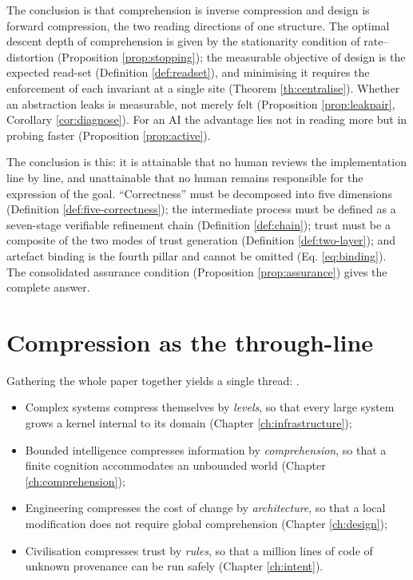 \begin{problem}
The conclusion is that comprehension is inverse compression and design is forward
compression, the two reading directions of one structure. The optimal descent depth of
comprehension is given by the stationarity condition of rate--distortion
(Proposition \ref{prop:stopping}); the measurable objective of design is the expected
read-set (Definition \ref{def:readset}), and minimising it requires the enforcement of
each invariant at a single site (Theorem \ref{th:centralise}). Whether an abstraction
leaks is measurable, not merely felt (Proposition \ref{prop:leakpair},
Corollary \ref{cor:diagnose}). For an AI the advantage lies not in reading more but in
probing faster (Proposition \ref{prop:active}).
\end{problem}

\begin{problem}
The conclusion is this: it is attainable that no human reviews the implementation line
by line, and unattainable that no human remains responsible for the expression of the
goal. ``Correctness'' must be decomposed into five dimensions
(Definition \ref{def:five-correctness}); the intermediate process must be defined as a
seven-stage verifiable refinement chain (Definition \ref{def:chain}); trust must be a
composite of the two modes of trust generation (Definition \ref{def:two-layer}); and
artefact binding is the fourth pillar and cannot be omitted (Eq. \eqref{eq:binding}). The
consolidated assurance condition (Proposition \ref{prop:assurance}) gives the complete answer.
\end{problem}

\section{Compression as the through-line}

Gathering the whole paper together yields a single thread: .

\begin{itemize}
\item Complex systems compress themselves by \emph{levels}, so that every large system
      grows a kernel internal to its domain (Chapter \ref{ch:infrastructure});
\item Bounded intelligence compresses information by \emph{comprehension}, so that a
      finite cognition accommodates an unbounded world (Chapter \ref{ch:comprehension});
\item Engineering compresses the cost of change by \emph{architecture}, so that a local
      modification does not require global comprehension (Chapter \ref{ch:design});
\item Civilisation compresses trust by \emph{rules}, so that a million lines of code of
      unknown provenance can be run safely (Chapter \ref{ch:intent}).
\end{itemize}


